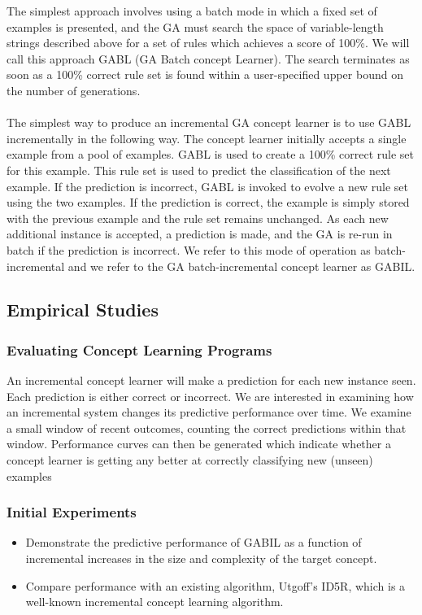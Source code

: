 \documentclass[../main.tex]{subfiles}
\begin{document}
The simplest approach involves using a batch mode in which a fixed set of examples is presented, and the GA must search
the space of variable-length strings described above for a set of rules which achieves a score of 100\%. We will call
this approach GABL (GA Batch concept Learner). The search terminates as soon as a 100\% correct rule set is found
within a user-specified upper bound on the number of generations.
\\\\
The simplest way to produce an incremental GA concept learner is to use GABL incrementally in the following way. The
concept learner initially accepts a single example from a pool of examples. GABL is used to create a 100\% correct rule
set for this example. This rule set is used to predict the classification of the next example. If the prediction is
incorrect, GABL is invoked to evolve a new rule set using the two examples. If the prediction is correct, the example
is simply stored with the previous example and the rule set remains unchanged. As each new additional instance is
accepted, a prediction is made, and the GA is re-run in batch if the prediction is incorrect. We refer to this mode of
operation as batch-incremental and we refer to the GA batch-incremental concept learner as GABIL.

\subsection{Empirical Studies}

\subsubsection{Evaluating Concept Learning Programs}

An incremental concept learner will make a prediction for each new instance seen. Each prediction is either correct or
incorrect. We are interested in examining how an incremental system changes its predictive performance over time. We
examine a small window of recent outcomes, counting the correct predictions within that window. Performance curves can
then be generated which indicate whether a concept learner is getting any better at correctly classifying new (unseen)
examples

\subsubsection{Initial Experiments}

\begin{itemize}
	\item Demonstrate the predictive performance of GABIL as a function of incremental increases in the size and
	complexity of the target concept.
	\item Compare performance with an existing algorithm, Utgoff’s ID5R, which is a well-known incremental concept
	learning algorithm.
\end{itemize}
\end{document}
